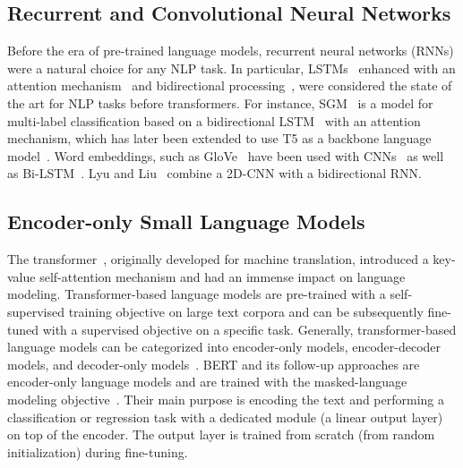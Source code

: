 \documentclass[lettersize,journal]{IEEEtran}
\begin{document}
\subsection{Recurrent and Convolutional Neural Networks}

Before the era of pre-trained language models, recurrent neural networks (RNNs) were a natural choice for any NLP task.
In particular, LSTMs~\cite{lstm} enhanced with an attention mechanism~\cite{bahdanau2014neural} and bidirectional processing~\cite{liu2016recurrent}, were considered the state of the art for NLP tasks before transformers.
For instance, SGM~\cite{sgm} is a model for multi-label classification based on a bidirectional LSTM~\cite{lstm} with an attention mechanism, which has later been extended to use T5 as a backbone language model~\cite{seq2tree}. 
Word embeddings, such as GloVe~\cite{DBLP:conf/emnlp/PenningtonSM14} have been used with CNNs~\cite{DBLP:conf/coling/HuangCC22} as well as Bi-LSTM~\cite{zhao2021sequential}.
Lyu and Liu~\cite{DBLP:journals/corr/abs-2006-15795} combine a 2D-CNN with a bidirectional RNN.

\subsection{Encoder-only Small Language Models}
The transformer~\cite{DBLP:conf/nips/VaswaniSPUJGKP17}, originally developed for machine translation, introduced a key-value self-attention mechanism and had an immense impact on language modeling.
Transformer-based language models are pre-trained with a self-supervised training objective on large text corpora and can be subsequently fine-tuned with a supervised objective on a specific task.
Generally, transformer-based language models can be categorized into encoder-only models, encoder-decoder models, and decoder-only models~\cite{yang2023harnessing}.
BERT and its follow-up approaches are encoder-only language models and are trained with the masked-language modeling objective~\cite{DBLP:conf/naacl/DevlinCLT19}.
Their main purpose is encoding the text and performing a classification or regression task with a dedicated module (\eg a linear output layer) on top of the encoder.
The output layer is trained from scratch (\ie from random initialization) during fine-tuning.
\end{document}
